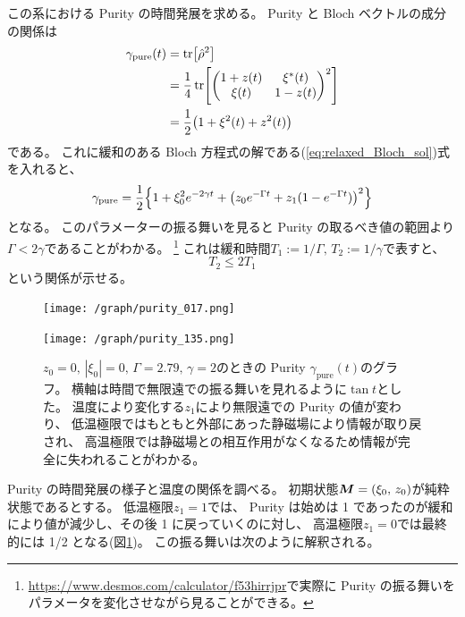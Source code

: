 \documentclass[11pt,dvipdfmx,a4paper]{jsarticle}
\begin{document}
この系における Purity の時間発展を求める。
Purity と Bloch ベクトルの成分の関係は
\begin{align}
	\gamma_{\text{pure}}(t) &= \tr[\hat{\rho}^2] \notag\\
	&=\frac{1}{4}\tr[
		\begin{pmatrix}
			1 + z(t) & \xi^*(t)\\
			\xi(t) & 1 - z(t)
		\end{pmatrix}^2]\notag\\
	&=\frac{1}{2}\qty(1+\xi^2(t)+z^2(t)) \notag\\
\end{align}
である。
これに緩和のある Bloch 方程式の解である(\ref{eq:relaxed_Bloch_sol})式を入れると、
\begin{equation}
	\gamma_{\text{pure}} = \frac{1}{2}\Bigl\{1+\xi_0^2e^{-2\gamma t}+\qty(z_0 e^{-\Gamma t} + z_{1}(1-e^{-\Gamma t}))^2\Bigr\}
\end{equation}
となる。
このパラメーターの振る舞いを見ると Purity の取るべき値の範囲より\(\Gamma < 2\gamma\)であることがわかる。
\footnote{\url{https://www.desmos.com/calculator/f53hirrjpr}で実際に Purity の振る舞いをパラメータを変化させながら見ることができる。}
これは緩和時間\(T_1 := 1/\Gamma,\,T_2 := 1/\gamma\)で表すと、
\begin{equation}
	T_2 \le 2T_1
\end{equation}
という関係が示せる。

\begin{figure}[htb]
	\centering
	\begin{minipage}[t]{0.48\columnwidth}
		\centering
		\texttt{[image: /graph/purity\_017.png]}
	\end{minipage}
	\hfill
	\begin{minipage}[t]{0.48\columnwidth}
		\centering
		\texttt{[image: /graph/purity\_135.png]}
	\end{minipage}
	\caption{\(z_0 = 0,\, |\xi_0|=0,\,\Gamma=2.79,\,\gamma=2\)のときの
	 Purity \(\gamma_{\text{pure}}(t)\)のグラフ。
	 横軸は時間で無限遠での振る舞いを見れるように\(\tan t\)とした。
	 温度により変化する\(z_{1}\)により無限遠での Purity の値が変わり、
	 低温極限ではもともと外部にあった静磁場により情報が取り戻され、
	 高温極限では静磁場との相互作用がなくなるため情報が完全に失われることがわかる。}
	 \label{graph:purity}
\end{figure}

Purity の時間発展の様子と温度の関係を調べる。
初期状態\(\vb*{M}=(\xi_0,\,z_0)\)が純粋状態であるとする。
低温極限\(z_{1}=1\)では、
Purity は始めは 1 であったのが緩和により値が減少し、その後 1 に戻っていくのに対し、
高温極限\(z_{1}=0\)では最終的には 1/2 となる(図\ref{graph:purity})。
この振る舞いは次のように解釈される。
\end{document}
